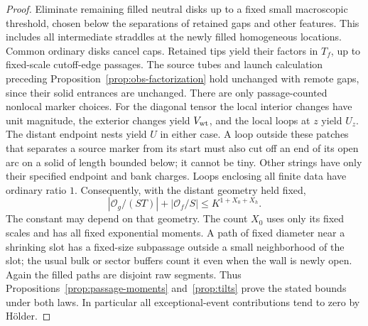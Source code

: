 \begin{proof}
Eliminate remaining filled neutral disks up to a fixed small
macroscopic threshold, chosen below the separations of retained
gaps and other features.  This includes all intermediate straddles
at the newly filled homogeneous locations.  Common ordinary disks
cancel caps.  Retained tips yield their factors in $T_f$, up to
fixed-scale cutoff-edge passages.  The source tubes and launch
calculation preceding Proposition~\ref{prop:obs-factorization}
hold unchanged with remote gaps, since their solid entrances
are unchanged.  There are only passage-counted nonlocal marker
choices.  For the diagonal tensor the local interior changes have
unit magnitude, the exterior changes yield $V_{\rm wt}$, and
the local loops at $z$ yield $U_z$.  The distant endpoint nests
yield $U$ in either case.  A loop outside these patches that
separates a source marker from its start must also cut off an end
of its open arc on a solid of length bounded below; it cannot be
tiny.  Other strings have only their specified endpoint and bank
charges.  Loops enclosing all finite data have ordinary ratio $1$.
Consequently, with the distant geometry held fixed,
\begin{equation}
 |\mathcal O_g/(ST)|+|\mathcal O_f/S|
       \le K^{1+X_0+X_h}.
 \label{obs:gap-absolute-moments}
\end{equation}
The constant may depend on that geometry.  The count $X_0$ uses
only its fixed scales and has all fixed exponential moments.
A path of fixed diameter near a shrinking slot has a fixed-size
subpassage outside a small neighborhood of the slot; the usual
bulk or sector buffers count it even when the wall is newly
open.  Again the filled paths are disjoint raw segments.  Thus
Propositions~\ref{prop:passage-moments} and~\ref{prop:tilts}
prove the stated bounds under both laws.  In particular all
exceptional-event contributions tend to zero by H\"older.


\end{proof}
